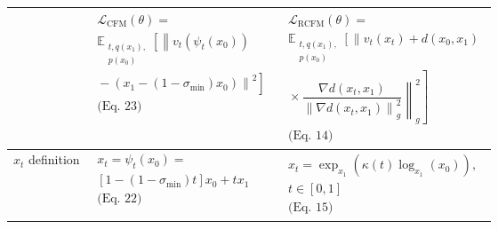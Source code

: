 \documentclass[landscape]{article}
\begin{document}
{\begin{tabular}{|p{}|p{}|p{}|}
& $\begin{gathered}
\mathcal{L}_{\mathrm{CFM}}(\theta)=\\
\mathbb{E}_{\substack{t,q(x_1),\\p(x_0)}}\!\left[
\left\lVert v_t\!\left(\psi_t(x_0)\right)\right.\right.\\
\left.\left.{}-\left(x_1-(1-\sigma_{\min})x_0\right)
\right\rVert^2\right]\\
\text{(Eq.~23)}
\end{gathered}$
& $\begin{gathered}
\mathcal{L}_{\mathrm{RCFM}}(\theta)=\\
\mathbb{E}_{\substack{t,q(x_1),\\p(x_0)}}\!\left[
\left\lVert v_t(x_t)+d(x_0,x_1)\right.\right.\\
\left.\left.{}\times\dfrac{\nabla d(x_t,x_1)}
{\left\lVert\nabla d(x_t,x_1)\right\rVert_g^2}
\right\rVert_g^2\right]\\
\text{(Eq.~14)}
\end{gathered}$ \\
\hline
$x_t$ definition
& $\begin{gathered}
x_t=\psi_t(x_0)=\\
\left[1-(1-\sigma_{\min})t\right]x_0+t x_1\\
\text{(Eq.~22)}
\end{gathered}$
& $\begin{gathered}
x_t=\exp_{x_1}\!\left(
\kappa(t)\log_{x_1}(x_0)\right),\\
t\in[0,1]\\
\text{(Eq.~15)}
\end{gathered}$ \\
\hline
\end{tabular}%
}
\end{document}
